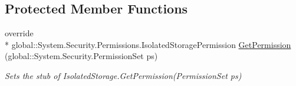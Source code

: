 \subsection*{Protected Member Functions}
\begin{DoxyCompactItemize}
\item 
override \\*
global\-::\-System.\-Security.\-Permissions.\-Isolated\-Storage\-Permission \hyperlink{class_system_1_1_i_o_1_1_isolated_storage_1_1_fakes_1_1_stub_isolated_storage_a2a44131b3ecd43274a3e892ae10a19d1}{Get\-Permission} (global\-::\-System.\-Security.\-Permission\-Set ps)
\begin{DoxyCompactList}\small\item\em Sets the stub of Isolated\-Storage.\-Get\-Permission(\-Permission\-Set ps)\end{DoxyCompactList}\end{DoxyCompactItemize}
